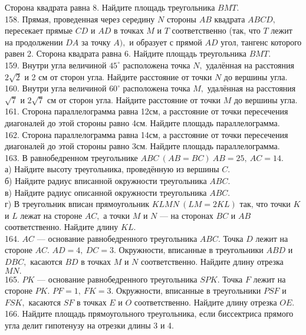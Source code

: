 Сторона квадрата равна 8. Найдите площадь треугольника $BMT.$\\
158. Прямая, проведенная через середину $N$ стороны $AB$ квадрата $ABCD,$ пересекает прямые $CD$ и
$AD$ в точках $M$ и $T$ соответственно (так, что $T$ лежит на продолжении $DA$ за точку $A),$ и
образует с прямой $AD$ угол, тангенс которого равен 2. Сторона квадрата равна 6. Найдите площадь треугольника $BMT.$\\
159. Внутри угла величиной $45^\circ$ расположена точка $N,$ удалённая на расстояния $2\sqrt{2}$ и 2 см от сторон угла.
Найдите расстояние от точки $N$ до вершины угла.\\
160. Внутри угла величиной $60^\circ$ расположена точка $M,$ удалённая на расстояния $\sqrt{7}$ и $2\sqrt{7}$ см от
сторон угла. Найдите расстояние от точки $M$ до вершины угла.\\
161. Сторона параллелограмма равна 12см, а расстояние от точки пересечения диагоналей до этой стороны равно 4см. Найдите площадь параллелограмма.\\
162. Сторона параллелограмма равна 14см, а расстояние от точки пересечения диагоналей до этой стороны равно 3см. Найдите площадь параллелограмма.\\
163. В равнобедренном треугольнике $ABC\ (AB=BC)\ AB=25,\ AC=14.$\\
а) Найдите высоту треугольника, проведённую из вершины $C.$\\
б) Найдите радиус вписанной окружности треугольника $ABC.$\\
в) Найдите радиус описанной окружности треугольника $ABC.$\\
г) В треугольник вписан прямоугольник $KLMN\ (LM=2KL)$ так, что точки $K$ и $L$ лежат на стороне $AC,$ а точки $M$ и $N$ --- на сторонах $BC$ и $AB$ соответственно. Найдите длину $KL.$\\
164. $AC$ --- основание равнобедренного треугольника $ABC.$ Точка $D$ лежит на стороне $AC.$ $AD=4,\ DC=3.$ Окружности, вписанные в треугольники $ABD$ и $DBC,$ касаются $BD$ в точках $M$ и $N$ соответственно. Найдите длину отрезка $MN.$\\
165. $PK$ --- основание равнобедренного треугольника $SPK.$ Точка $F$ лежит на стороне $PK.$ $PF=1,\ FK=3.$ Окружности, вписанные в треугольники $PSF$ и $FSK,$ касаются $SF$ в точках $E$ и $O$ соответственно. Найдите длину отрезка $OE.$\\
166. Найдите площадь прямоугольного треугольника, если биссектриса прямого угла делит гипотенузу на отрезки длины 3 и 4.\\
